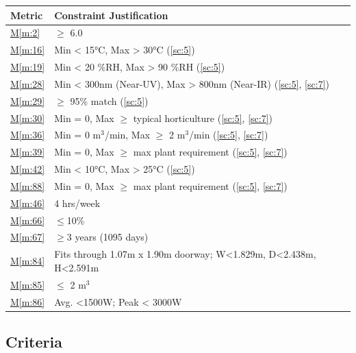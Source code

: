 \documentclass{report}
\newcommand{\mref}[1]{\hyperref[#1]{M\ref{#1}}}
\begin{document}
\begin{tabular}{|l|p{14.35cm}|}
    \hline
    \textbf{Metric} & \textbf{Constraint \hfill Justification} \\
    \hline
    \mref{m:2} & $\ge$ 6.0 \hfill \cite{applicantguide,dsfc-phase2}\\
    \hline
    \mref{m:16} & Min < 15°C, Max > 30°C \hfill (\ref{sc:5})\\
    \hline
    \mref{m:19} & Min < 20 \%RH, Max > 90 \%RH \hfill (\ref{sc:5}) \\
    \hline
    \mref{m:28} & Min < 300nm (Near-UV), Max > 800nm (Near-IR) \hfill (\ref{sc:5}, \ref{sc:7}) \\
    \hline
    \mref{m:29} & $\ge$ 95\% match \hfill (\ref{sc:5}) \\
    \hline
    \mref{m:30} & Min = 0, Max $\ge$ typical horticulture \hfill (\ref{sc:5}, \ref{sc:7}) \\
    \hline
    \mref{m:36} & Min = 0 m${}^3$/min, Max $\ge$ 2 m${}^3$/min \hfill (\ref{sc:5}, \ref{sc:7}) \\
    \hline
    \mref{m:39} & Min = 0, Max $\ge$ max plant requirement \hfill (\ref{sc:5}, \ref{sc:7}) \\
    \hline
    \mref{m:42} & Min < 10°C, Max > 25°C \hfill (\ref{sc:5})\\
    \hline
    \mref{m:88} & Min = 0, Max $\ge$ max plant requirement \hfill (\ref{sc:5}, \ref{sc:7}) \\
    \hline
    \mref{m:46} & 4 hrs/week \hfill \cite{applicantguide}\\
    \hline
    \mref{m:66} & $\le$10\% \hfill \cite{applicantguide}\\
    \hline
    \mref{m:67} & $\ge$3 years (1095 days) \hfill \cite{applicantguide}\\
    \hline
    \mref{m:84} & Fits through 1.07m x 1.90m doorway; W<1.829m, D<2.438m, H<2.591m \hfill \cite{applicantguide} \\
    \hline
    \mref{m:85} & $\le$ 2 m${}^3$ \hfill \cite{applicantguide}\\
    \hline
    \mref{m:86} & Avg. <1500W; Peak < 3000W \hfill \cite{applicantguide}\\
    \hline
\end{tabular}

\subsection{Criteria}
\label{sec:criteria}
\end{document}
